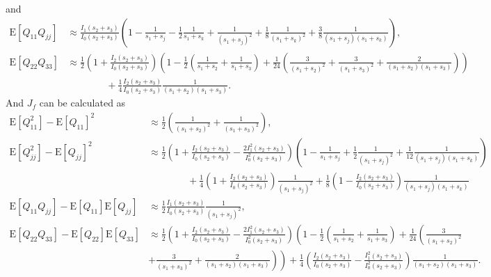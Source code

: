 \documentclass[10pt]{article}
\newcommand{\expect}[1]{\ensuremath{\mathrm{E}\left[ #1 \right]}}
\begin{document}
and
\begin{align}
	\expect{Q_{11}Q_{jj}} &\approx \tfrac{I_1(s_2+s_3)}{I_0(s_2+s_3)} \left( 1 - \tfrac{1}{s_1+s_j} - \tfrac{1}{2}\tfrac{1}{s_1+s_k} + \tfrac{1}{(s_1+s_j)^2} + \tfrac{1}{8}\tfrac{1}{(s_1+s_k)^2} + \tfrac{3}{8}\tfrac{1}{(s_1+s_j)(s_1+s_k)} \right), \\
	\expect{Q_{22}Q_{33}} &\approx \tfrac{1}{2} \left( 1 + \tfrac{I_2(s_2+s_3)}{I_0(s_2+s_3)} \right) \left( 1 - \tfrac{1}{2}\left( \tfrac{1}{s_1+s_2} + \tfrac{1}{s_1+s_3} \right) + \tfrac{1}{24}\left( \tfrac{3}{(s_1+s_2)^2} + \tfrac{3}{(s_1+s_3)^2} + \tfrac{2}{(s_1+s_2)(s_1+s_3)} \right) \right) \nonumber \\ 
	&\qquad\qquad + \tfrac{1}{4} \tfrac{I_2(s_2+s_3)}{I_0(s_2+s_3)} \tfrac{1}{(s_1+s_2)(s_1+s_3)}.
\end{align}
And $J_f$ can be calculated as
\begin{align}
	\expect{Q_{11}^2} - \expect{Q_{11}}^2 &\approx \frac{1}{2}\left( \frac{1}{(s_1+s_2)^2} + \frac{1}{(s_1+s_3)^2} \right), \\
	\expect{Q_{jj}^2} - \expect{Q_{jj}}^2 &\approx \frac{1}{2}\left( 1 + \frac{I_2(s_2+s_3)}{I_0(s_2+s_3)} - \frac{2I_1^2(s_2+s_3)}{I_0^2(s_2+s_3)} \right) \left( 1 - \frac{1}{s_1+s_j} + \frac{1}{2} \frac{1}{(s_1+s_j)^2} + \frac{1}{12} \frac{1}{(s_1+s_j)(s_1+s_k)} \right) \nonumber \\
	&\qquad\qquad + \frac{1}{4}\left( 1 + \frac{I_2(s_2+s_3)}{I_0(s_2+s_3)} \right) \frac{1}{(s_1+s_j)^2} + \frac{1}{8}\left( 1 - \frac{I_2(s_2+s_3)}{I_0(s_2+s_3)} \right) \frac{1}{(s_1+s_j)(s_1+s_k)} \\
	\expect{Q_{11}Q_{jj}} - \expect{Q_{11}}\expect{Q_{jj}} &\approx \frac{1}{2} \frac{I_1(s_2+s_3)}{I_0(s_2+s_3)} \frac{1}{(s_1+s_j)^2}, \\
	\expect{Q_{22}Q_{33}} - \expect{Q_{22}}\expect{Q_{33}} &\approx \frac{1}{2}\left( 1 + \frac{I_2(s_2+s_3)}{I_0(s_2+s_3)} - \frac{2I_1^2(s_2+s_3)}{I_0^2(s_2+s_3)} \right) \left( 1 - \frac{1}{2}\left( \frac{1}{s_1+s_2} + \frac{1}{s_1+s_3} \right) + \frac{1}{24}\left( \frac{3}{(s_1+s_2)^2} \right. \right. \nonumber \\
	& \left. \left. + \frac{3}{(s_1+s_3)^2} + \frac{2}{(s_1+s_2)(s_1+s_3)} \right) \right) + \frac{1}{4}\left( \frac{I_2(s_2+s_3)}{I_0(s_2+s_3)} - \frac{I_1^2(s_2+s_3)}{I_0^2(s_2+s_3)} \right) \frac{1}{(s_1+s_2)(s_1+s_3)}.
\end{align}
\end{document}
